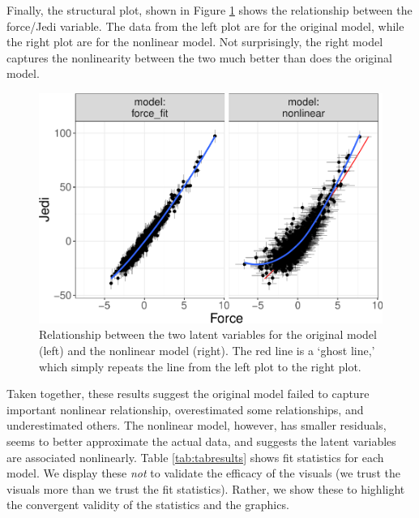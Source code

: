 \documentclass[
  english,
  doc]{apa6}
\begin{document}
Finally, the structural plot, shown in Figure \ref{fig:structureNonlin} shows the relationship between the force/Jedi variable. The data from the left plot are for the original model, while the right plot are for the nonlinear model. Not surprisingly, the right model captures the nonlinearity between the two much better than does the original model.

\begin{figure}
\centering
\includegraphics{flexplavaan_draft_files/figure-latex/structureNonlin-1.pdf}
\caption{\label{fig:structureNonlin}Relationship between the two latent variables for the original model (left) and the nonlinear model (right). The red line is a `ghost line,' which simply repeats the line from the left plot to the right plot.}
\end{figure}

Taken together, these results suggest the original model failed to capture important nonlinear relationship, overestimated some relationships, and underestimated others. The nonlinear model, however, has smaller residuals, seems to better approximate the actual data, and suggests the latent variables are associated nonlinearly. Table \ref{tab:tabresults} shows fit statistics for each model. We display these \emph{not} to validate the efficacy of the visuals (we trust the visuals more than we trust the fit statistics). Rather, we show these to highlight the convergent validity of the statistics and the graphics.
\end{document}
